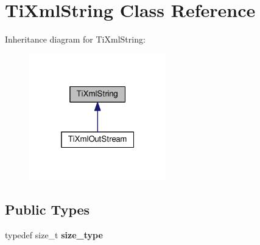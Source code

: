 \hypertarget{classTiXmlString}{}\section{Ti\+Xml\+String Class Reference}
\label{classTiXmlString}


Inheritance diagram for Ti\+Xml\+String\+:\nopagebreak
\begin{figure}[H]
\begin{center}
\leavevmode
\includegraphics[width=169pt]{classTiXmlString__inherit__graph}
\end{center}
\end{figure}
\subsection*{Public Types}
\begin{DoxyCompactItemize}
\item 
typedef size\+\_\+t {\bfseries size\+\_\+type}\hypertarget{classTiXmlString_abeb2c1893a04c17904f7c06546d0b971}{}\label{classTiXmlString_abeb2c1893a04c17904f7c06546d0b971}

\end{DoxyCompactItemize}
